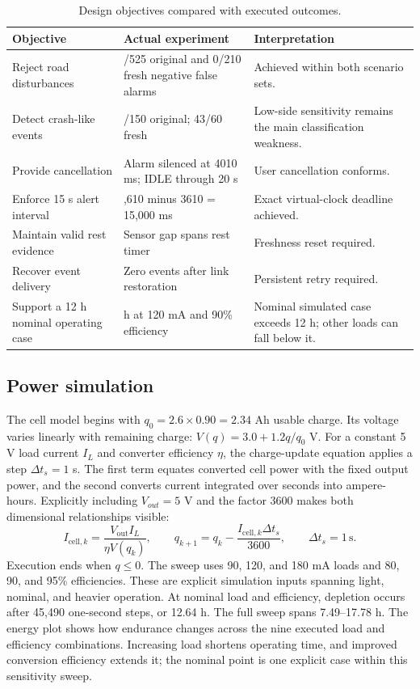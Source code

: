 \documentclass[10pt,a4paper]{article}
\begin{document}
\begin{table}[H]\centering\small\caption{Design objectives compared with executed outcomes.}
\begin{tabularx}{\linewidth}{@{}>{\raggedright\arraybackslash}p{.26\linewidth}>{\raggedright\arraybackslash}p{.36\linewidth}X@{}}\toprule
Objective & Actual experiment & Interpretation\\\midrule
Reject road disturbances & 0/525 original and 0/210 fresh negative false alarms & Achieved within both scenario sets.\\
Detect crash-like events & 114/150 original; 43/60 fresh & Low-side sensitivity remains the main classification weakness.\\
Provide cancellation & Alarm silenced at 4010 ms; IDLE through 20 s & User cancellation conforms.\\
Enforce 15 s alert interval & 18,610 minus 3610 = 15,000 ms & Exact virtual-clock deadline achieved.\\
Maintain valid rest evidence & Sensor gap spans rest timer & Freshness reset required.\\
Recover event delivery & Zero events after link restoration & Persistent retry required.\\
Support a 12 h nominal operating case & 12.64 h at 120 mA and 90\% efficiency & Nominal simulated case exceeds 12 h; other loads can fall below it.\\\bottomrule
\end{tabularx}\end{table}

\subsection{Power simulation}
The cell model begins with $q_0=2.6\times0.90=2.34$ Ah usable charge. Its voltage varies linearly with remaining charge: $V(q)=3.0+1.2q/q_0$ V. For a constant 5 V load current $I_L$ and converter efficiency $\eta$, the charge-update equation applies a step $\Delta t_s=1$ s. The first term equates converted cell power with the fixed output power, and the second converts current integrated over seconds into ampere-hours. Explicitly including $V_{out}=5$ V and the factor 3600 makes both dimensional relationships visible:
\begin{equation}
 I_{\mathrm{cell},k}=\frac{V_{\mathrm{out}}I_L}{\eta V(q_k)},\qquad q_{k+1}=q_k-\frac{I_{\mathrm{cell},k}\Delta t_s}{3600},\qquad \Delta t_s=1\,\mathrm{s}.
\end{equation}
Execution ends when $q\leq0$. The sweep uses 90, 120, and 180 mA loads and 80, 90, and 95\% efficiencies. These are explicit simulation inputs spanning light, nominal, and heavier operation. At nominal load and efficiency, depletion occurs after 45,490 one-second steps, or 12.64 h. The full sweep spans 7.49--17.78 h.
The energy plot shows how endurance changes across the nine executed load and efficiency combinations. Increasing load shortens operating time, and improved conversion efficiency extends it; the nominal point is one explicit case within this sensitivity sweep.
\end{document}
